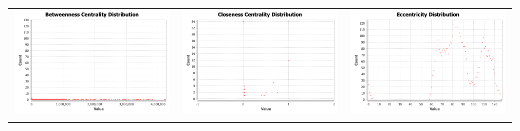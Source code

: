 \documentclass[11pt]{article}
\begin{document}
\begin{table}[H]
	\centering
	\begin{tabular}{ccc}
		\includegraphics[scale=0.25]{images/2_1_betweenness.png} & \includegraphics[scale=0.25]{images/2_1_closeness.png} &
		\includegraphics[scale=0.25]{images/2_1_eccentricity.png} 
	\end{tabular}
\end{table}
\end{document}
